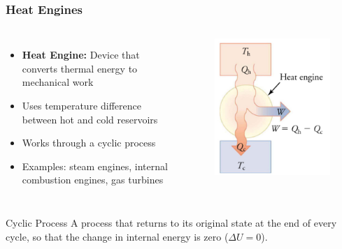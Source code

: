 \documentclass{beamer}
\begin{document}
\begin{frame}
    \frametitle{Heat Engines}
    \begin{columns}
        \begin{itemize}
            \item \textbf{Heat Engine:} Device that converts thermal energy to mechanical work
            \item Uses temperature difference between hot and cold reservoirs
            \item Works through a cyclic process
            \item Examples: steam engines, internal combustion engines, gas turbines
        \end{itemize}
        
        \begin{center}
            \begin{figure}
                \centering
                \includegraphics[width=0.7\linewidth]{imagez.png}
            \end{figure}
        \end{center}
    \end{columns}
    
    \begin{block}{Cyclic Process}
        A process that returns to its original state at the end of every cycle, so that the change in internal energy is zero ($\Delta U = 0$).
    \end{block}
\end{frame}
\end{document}
